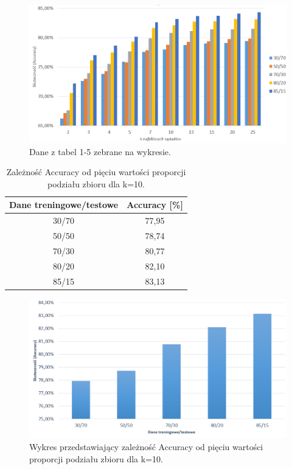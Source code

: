 \documentclass{classrep}
\begin{document}
\begin{figure}[h!]
    \centering
    \includegraphics[width=1\textwidth]{testtren.png}
    \caption{Dane z tabel 1-5 zebrane na wykresie.}
    \label{testtren}
\end{figure}

\begin{table}[h!]
	\centering
	\begin{tabular} {c c}
		\hline
		\textbf{Dane treningowe/testowe} & \textbf{Accuracy [\%]} \\ [0.5ex] 
		\hline
		\hline 
		30/70 & 77,95 \\ 
		50/50 & 78,74 \\
		70/30 & 80,77 \\
		80/20 & 82,10 \\
		85/15 & 83,13 \\
		\hline
	\end{tabular}
	\caption{Zależność Accuracy od pięciu wartości proporcji podziału zbioru dla k=10. }
\end{table}

\begin{figure}[h!]
    \centering
    \includegraphics[width=1\textwidth]{5podzialk10.png}
    \caption{Wykres przedstawiający zależność Accuracy od pięciu wartości proporcji podziału zbioru dla k=10.}
    \label{5podzialk10}
\end{figure}
\end{document}
